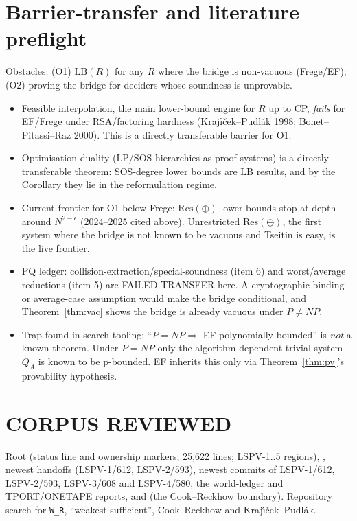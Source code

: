 \documentclass[11pt]{article}
\theoremstyle{definition}
\begin{document}
\section{Barrier-transfer and literature preflight}
Obstacles: (O1) $\mathrm{LB}(R)$ for any $R$ where the bridge is non-vacuous (Frege/EF);
(O2) proving the bridge for deciders whose soundness is unprovable.
\begin{itemize}
\item Feasible interpolation, the main lower-bound engine for $R$ up to CP, \emph{fails} for
EF/Frege under RSA/factoring hardness (Kraj\'\i\v{c}ek--Pudl\'ak 1998; Bonet--Pitassi--Raz 2000).
This is a directly transferable barrier for O1.
\item Optimisation duality (LP/SOS hierarchies as proof systems) is a directly transferable theorem:
SOS-degree lower bounds are $\mathrm{LB}$ results, and by the Corollary they lie in the
reformulation regime.
\item Current frontier for O1 below Frege: $\mathrm{Res}(\oplus)$ lower bounds stop at depth
around $N^{2-\epsilon}$ (2024--2025 cited above). Unrestricted $\mathrm{Res}(\oplus)$, the
first system where the bridge is not known to be vacuous and Tseitin is easy, is the live
frontier.
\item PQ ledger: collision-extraction/special-soundness (item 6) and worst/average reductions
(item 5) are FAILED TRANSFER here. A cryptographic binding or average-case assumption would make
the bridge conditional, and Theorem~\ref{thm:vac} shows the bridge is already vacuous under
$P\ne NP$.
\item Trap found in search tooling: ``$P=NP\Rightarrow$ EF polynomially bounded'' is \emph{not}
a known theorem. Under $P=NP$ only the algorithm-dependent trivial system $Q_A$ is known to be
p-bounded. EF inherits this only via Theorem~\ref{thm:pv}'s provability hypothesis.
\end{itemize}

\section{CORPUS REVIEWED}
Root  (status line and ownership markers; 25{,}622 lines; LSPV-1..5 regions),
,  newest handoffs (LSPV-1/612, LSPV-2/593),
newest commits of LSPV-1/612, LSPV-2/593, LSPV-3/608 and LSPV-4/580, the
 world-ledger and TPORT/ONETAPE reports, and
(the Cook--Reckhow boundary). Repository search for \texttt{W\_R}, ``weakest sufficient'',
Cook--Reckhow and Kraj\'\i\v{c}ek--Pudl\'ak.
\end{document}
